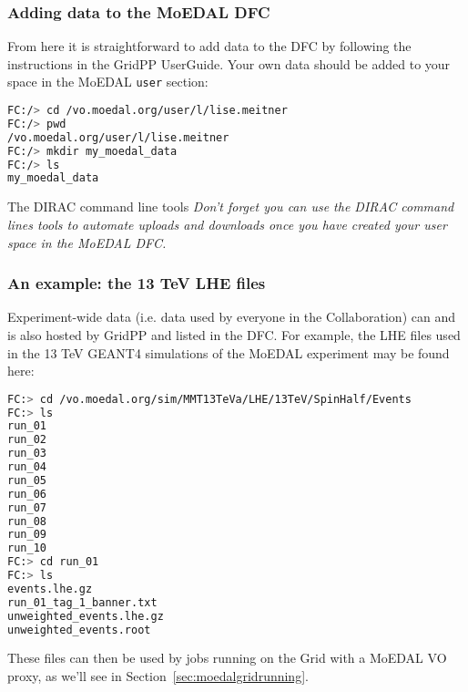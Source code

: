 \subsubsection{Adding data to the MoEDAL DFC}
\label{sec:addingdata}
From here it is straightforward to add data to the \ac{DFC} by
following the instructions in the GridPP UserGuide.
Your own data should be added to your space in the MoEDAL \texttt{user}
section:
\begin{lstlisting}[gobble=0,numbers=none,language=bash]
FC:/> cd /vo.moedal.org/user/l/lise.meitner
FC:/> pwd
/vo.moedal.org/user/l/lise.meitner
FC:/> mkdir my_moedal_data
FC:/> ls
my_moedal_data
\end{lstlisting}

\begin{hintbox}{The DIRAC command line tools}
\emph{Don't forget you can use the DIRAC command lines tools to
automate uploads and downloads once you have created your
user space in the MoEDAL \ac{DFC}.}
\end{hintbox}

\clearpage

\subsubsection{An example: the 13 TeV LHE files}
\label{sec:lhedataexample}
Experiment-wide data (i.e. data used by everyone in the Collaboration)
can and is also hosted by GridPP and listed in the \ac{DFC}.
For example, the \ac{LHE} files used in the 13 TeV GEANT4 simulations
of the \ac{MoEDAL} experiment may be found here:

\begin{lstlisting}[gobble=0,numbers=none,language=bash]
FC:> cd /vo.moedal.org/sim/MMT13TeVa/LHE/13TeV/SpinHalf/Events
FC:> ls
run_01
run_02
run_03
run_04
run_05
run_06
run_07
run_08
run_09
run_10
FC:> cd run_01
FC:> ls
events.lhe.gz
run_01_tag_1_banner.txt
unweighted_events.lhe.gz
unweighted_events.root
\end{lstlisting}

These files can then be used by jobs running on the Grid
with a \ac{MoEDAL} \ac{VO} proxy,
as we'll see in Section~\ref{sec:moedalgridrunning}.
